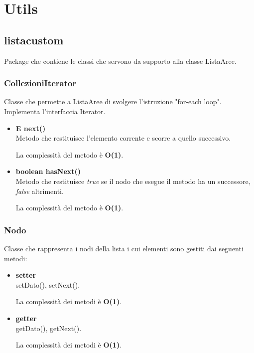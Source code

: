 \documentclass[a4paper, 12pt]{scrreprt}
\begin{document}
		\section{Utils}
			\subsection{listacustom}
			Package che contiene le classi che servono da supporto alla classe ListaAree.
				\subsubsection{CollezioniIterator}
				Classe che permette a ListaAree di svolgere l'istruzione "for-each loop". Implementa l'interfaccia Iterator.
				\begin{itemize}
					\item\textbf{E next()}
					\\Metodo che restituisce l'elemento corrente e scorre a quello successivo.
					
					La complessit\`a del metodo è \textbf{O(1)}.
					
					\item\textbf{boolean hasNext()}
					\\Metodo che restituisce \textit{true} se il nodo che esegue il metodo ha un successore, \textit{false} altrimenti.
					
					La complessit\`a del metodo è \textbf{O(1)}.
					
				\end{itemize}

				\subsubsection{Nodo}
				Classe che rappresenta i nodi della lista i cui elementi sono gestiti dai seguenti metodi:\\
				\begin{itemize}
					\item\textbf{setter}
					\\setDato(), setNext().
					
					La complessit\`a dei metodi è \textbf{O(1)}.
					
					\item\textbf{getter}
					\\getDato(), getNext().
					
					La complessit\`a dei metodi è \textbf{O(1)}.
					
				\end{itemize}
\end{document}
